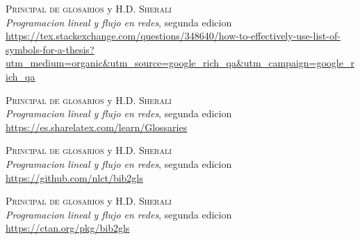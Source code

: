 \documentclass[letterpaper,12pt]{article}
\begin{document}
\begin{thebibliography}{X}
	 \textsc{Principal de glosarios} y \textsc{H.D. Sherali}\\
	\textit{Programacion lineal y flujo en redes}, segunda edicion\\
	\url{https://tex.stackexchange.com/questions/348640/how-to-effectively-use-list-of-symbols-for-a-thesis?utm_medium=organic&utm_source=google_rich_qa&utm_campaign=google_rich_qa}

	 \textsc{Principal de glosarios} y \textsc{H.D. Sherali}\\
	\textit{Programacion lineal y flujo en redes}, segunda edicion\\
	\url{https://es.sharelatex.com/learn/Glossaries}

	 \textsc{Principal de glosarios} y \textsc{H.D. Sherali}\\
	\textit{Programacion lineal y flujo en redes}, segunda edicion\\
	\url{https://github.com/nlct/bib2gls}

	 \textsc{Principal de glosarios} y \textsc{H.D. Sherali}\\
	\textit{Programacion lineal y flujo en redes}, segunda edicion\\
	\url{https://ctan.org/pkg/bib2gls}

\end{thebibliography}
\end{document}
